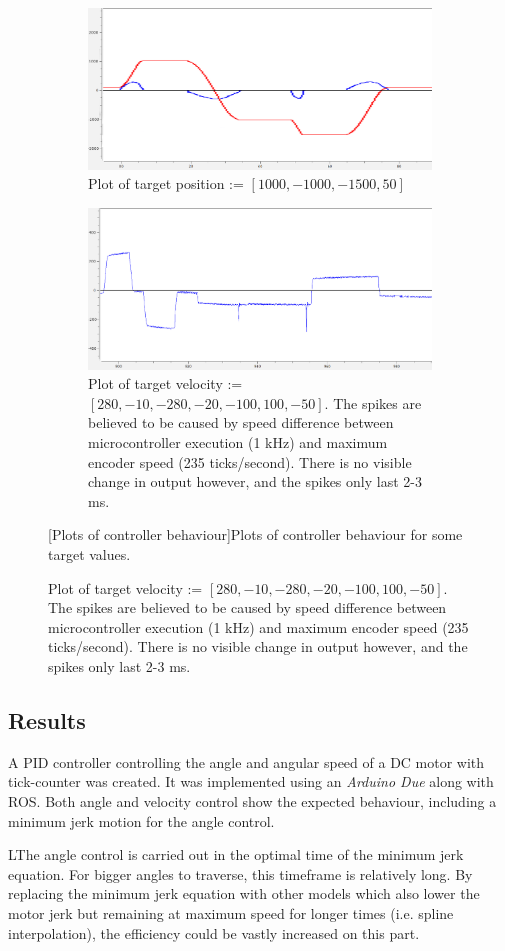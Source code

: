 \documentclass[11pt]{article}
\begin{document}
\begin{figure}[h]
  \centering
  \begin{subfigure}[b]{.9\textwidth}
    \centering
    \includegraphics[width=.9\textwidth]{figures/posplot.png}
    \caption{\scriptsize Plot of target position := $[{1000}, {-1000}, {-1500}, 50]$}\label{fig:pos}\vspace{20pt}
  \end{subfigure} 
  \begin{subfigure}[b]{.9\textwidth}
    \centering
    \includegraphics[width=.9\textwidth]{figures/velplot.png}
    \caption{\scriptsize Plot of target velocity := $[280, {-10}, {-280}, {-20}, {-100}, 100, {-50}]$. The spikes are believed to be caused by speed difference between microcontroller execution (1 kHz) and maximum encoder speed (235 ticks/second). There is no visible change in output however, and the spikes only last 2-3 ms.}    \label{fig:vel}
  \end{subfigure}
  [Plots of controller behaviour]{Plots of controller behaviour for some target values.}
\end{figure}
\subsection{Results}
A PID controller controlling the angle and angular speed of a DC motor with tick-counter was created. It was implemented using an \emph{Arduino Due} along with ROS. Both angle and velocity control show the expected behaviour, including a minimum jerk motion for the angle control.\par
LThe angle control is carried out in the optimal time of the minimum jerk equation. For bigger angles to traverse, this timeframe is relatively long. By replacing the minimum jerk equation with other models which also lower the motor jerk but remaining at maximum speed for longer times (i.e. spline interpolation), the efficiency could be vastly increased on this part.
\end{document}

